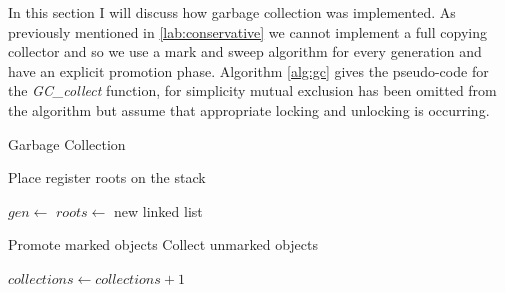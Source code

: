 \documentclass[../diss.tex]{subfiles}
\begin{document}
In this section I will discuss how garbage collection was implemented. As previously mentioned in \cref{lab:conservative} we cannot implement a full copying collector and so we use a mark and sweep algorithm for every generation and have an explicit promotion phase. Algorithm \ref{alg:gc} gives the pseudo-code for the \emph{GC\_collect} function, for simplicity mutual exclusion has been omitted from the algorithm but assume that appropriate locking and unlocking is occurring. 

\begin{algorithm}
\caption{Garbage Collection}
\label{alg:gc}
\begin{algorithmic}


\State Place register roots on the stack

\State
\State {} 
    \State {}
\EndWhile

\State

\State {} 
\State {}

\State

\State {} 

\State
\State $gen\gets $ 
\State $roots\gets$ new linked list
\State {}
\State {}
\State {}

\State

 
    \State {}
\EndWhile

\State
\State {}

\State
{}
    \State Promote marked objects
    \State Collect unmarked objects
\EndFor

\State
\State {}

\State $collections\gets collections + 1$

\State
\State {} 

 
    \State {}
\EndWhile

\State {} 

\EndFunction

\end{algorithmic}
\end{algorithm}
\end{document}
